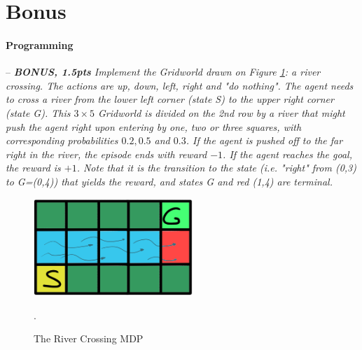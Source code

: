 \documentclass[a4paper]{article}
\newcommand{\programming}[1]{
\paragraph{Programming} -- \textit{#1}

}
\begin{document}
	\section{Bonus}
		\programming{\textbf{BONUS, 1.5pts} Implement the Gridworld drawn on Figure \ref{fig:river_crossing}: a river crossing. 
				The actions are up, down, left, right and "do nothing". 
				The agent needs to cross a river from the lower left corner (state S) to the upper right corner (state G). 
				This $3\times 5$ Gridworld is divided on the 2nd row by a river that might push the agent right upon entering by one, two or three squares, with corresponding probabilities $0.2, 0.5$ and $0.3$. 
				If the agent is pushed off to the far right in the river, the episode ends with reward $-1$. 
				If the agent reaches the goal, the reward is $+1$. 
				Note that it is the transition to the state (i.e. "right" from (0,3) to G=(0,4)) that yields the reward, and states G and red (1,4) are terminal.}

		\begin{figure}[H]
			\centering
			\includegraphics[width=6cm]{plots/river.png}
			\caption{The River Crossing MDP}.
			\label{fig:river_crossing}
		\end{figure}{}


	\printbibliography
\end{document}
